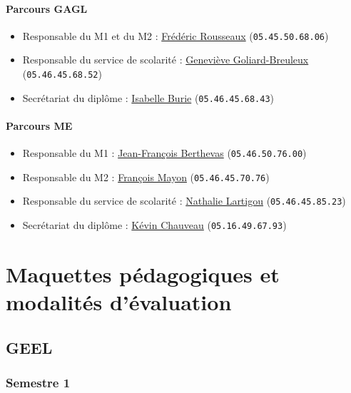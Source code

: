 \documentclass[a4paper,11pt]{article}
\begin{document}
\paragraph{Parcours GAGL}

\begin{itemize}
	\item Responsable du M1 et du M2 : \href{mailto:frederic.rousseaux@univ-lr.fr}{Frédéric Rousseaux} (\texttt{05.45.50.68.06})
	\item Responsable du service de scolarité : \href{mailto:genevieve.breuleux@univ-lr.fr}{Geneviève Goliard-Breuleux} (\texttt{05.46.45.68.52})
	\item Secrétariat du diplôme : \href{mailto:isabelle.burie@univ-lr.fr}{Isabelle Burie} (\texttt{05.46.45.68.43})
\end{itemize}

\paragraph{Parcours ME}

\begin{itemize}
	\item Responsable du M1 : \href{mailto:jean-francois.berthevas@univ-lr.fr}{Jean-François Berthevas} (\texttt{05.46.50.76.00})
	\item Responsable du M2 : \href{mailto:francois.mayon@univ-lr.fr}{François Mayon} (\texttt{05.46.45.70.76})
	\item Responsable du service de scolarité : \href{mailto:nathalie.lartigou}{Nathalie Lartigou} (\texttt{05.46.45.85.23})
	\item Secrétariat du diplôme : \href{mailto:kevin.chauveau}{Kévin Chauveau} (\texttt{05.16.49.67.93})
\end{itemize}

\section{Maquettes pédagogiques et modalités d'évaluation}\label{Maquette}

\subsection{GEEL}

\subsubsection{Semestre 1}
\end{document}
